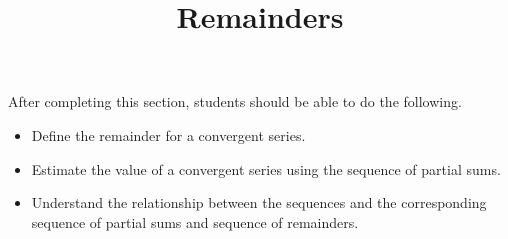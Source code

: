 \documentclass{ximera}
\title{Remainders}
\begin{document}
\begin{abstract}
\end{abstract}

\maketitle

\begin{sectionOutcomes}

After completing this section, students should be able to do the following.

\begin{itemize}
\item Define the remainder for a convergent series.
\item Estimate the value of a convergent series using the sequence of partial sums.
\item Understand the relationship between the sequences and the corresponding sequence of partial sums and sequence of remainders.
\end{itemize}

\end{sectionOutcomes}
\end{document}
